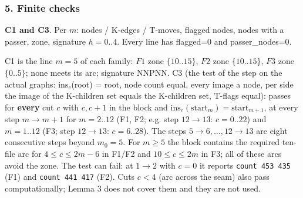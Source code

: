 \subsubsection*{5. Finite checks}
\textbf{C1 and C3}. Per $m$: nodes / K-edges / T-moves, flagged nodes, nodes with a passer, zone, signature $h=0..4$. Every line has flagged=0 and passer\_nodes=0.

\par{}\par\smallskip
C1 is the line $m=5$ of each family: $F1$ zone $\{10..15\}$, $F2$ zone $\{10..15\}$, $F3$ zone $\{0..5\}$; none meets its arc; signature NNPNN. C3 (the test of the step on the actual graphs: $\mathrm{ins}_c$(root) = root, node count equal, every image a node, per side the image of the K-children set equals the K-children set, T-flags equal): passes for \textbf{every} cut $c$ with $c,c+1$ in the block and $\mathrm{ins}_c(\mathrm{start}_m)=\mathrm{start}_{m+1}$, at every step $m\to m+1$ for $m=2..12$ (F1, F2; e.g. step $12\to13$: $c=0..22$) and $m=1..12$ (F3; step $12\to13$: $c=6..28$). The steps $5\to6,\dots,12\to13$ are eight consecutive steps beyond $m_0=5$. For $m\ge5$ the block contains the required ten-file arc for $4\le c\le2m-6$ in F1/F2 and $10\le c\le2m$ in F3; all of these arcs avoid the zone. The test can fail: at $1\to2$ with $c=0$ it reports \texttt{count 453 435} (F1) and \texttt{count 441 417} (F2). Cuts $c<4$ (arc across the seam) also pass computationally; Lemma 3 does not cover them and they are not used.

